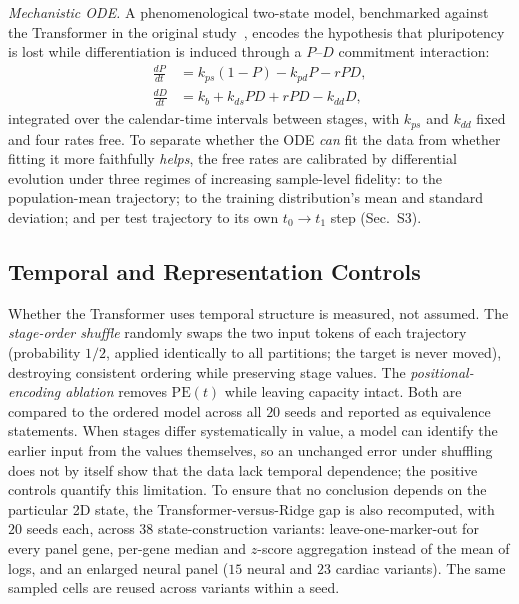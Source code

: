 \documentclass[10pt,journal,compsoc]{IEEEtran}
\begin{document}
\emph{Mechanistic ODE.} A phenomenological two-state model, benchmarked against the Transformer in the original study~\cite{kanu2026transformer}, encodes the hypothesis that pluripotency is lost while differentiation is induced through a $P$--$D$ commitment interaction:
\begin{align}
\frac{dP}{dt} &= k_{ps}(1-P) - k_{pd}P - rPD,
\label{eq:ode_p}\\
\frac{dD}{dt} &= k_b + k_{ds}PD + rPD - k_{dd}D,
\label{eq:ode_d}
\end{align}
integrated over the calendar-time intervals between stages, with $k_{ps}$ and $k_{dd}$ fixed and four rates free. To separate whether the ODE \emph{can} fit the data from whether fitting it more faithfully \emph{helps}, the free rates are calibrated by differential evolution under three regimes of increasing sample-level fidelity: to the population-mean trajectory; to the training distribution's mean and standard deviation; and per test trajectory to its own $t_0\!\rightarrow\!t_1$ step (Sec.~S3).
\label{subsec:ode_calib}

\subsection{Temporal and Representation Controls}
\label{subsec:controls}

Whether the Transformer uses temporal structure is measured, not assumed. The \emph{stage-order shuffle} randomly swaps the two input tokens of each trajectory (probability $1/2$, applied identically to all partitions; the target is never moved), destroying consistent ordering while preserving stage values. The \emph{positional-encoding ablation} removes $\mathrm{PE}(t)$ while leaving capacity intact. Both are compared to the ordered model across all $20$ seeds and reported as equivalence statements. When stages differ systematically in value, a model can identify the earlier input from the values themselves, so an unchanged error under shuffling does not by itself show that the data lack temporal dependence; the positive controls quantify this limitation.
\label{subsec:sensitivity}
To ensure that no conclusion depends on the particular 2D state, the Transformer-versus-Ridge gap is also recomputed, with $20$ seeds each, across $38$ state-construction variants: leave-one-marker-out for every panel gene, per-gene median and $z$-score aggregation instead of the mean of logs, and an enlarged neural panel ($15$ neural and $23$ cardiac variants). The same sampled cells are reused across variants within a seed.
\end{document}
